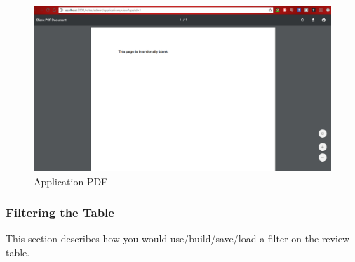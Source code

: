 \documentclass[fontsize=12pt,paper=letter,twoside]{scrartcl}
\begin{document}
\begin{figure}[!htb]
\begin{center}
\includegraphics[width=.9\textwidth]{images/adm/ma/appl_pdf.png}
\end{center}
\caption{Application PDF}
\label{fig:adm/appl_pdf}
\end{figure}

\clearpage
\subsubsection{Filtering the Table}
This section describes how you would use/build/save/load a filter on the review table.
\end{document}
